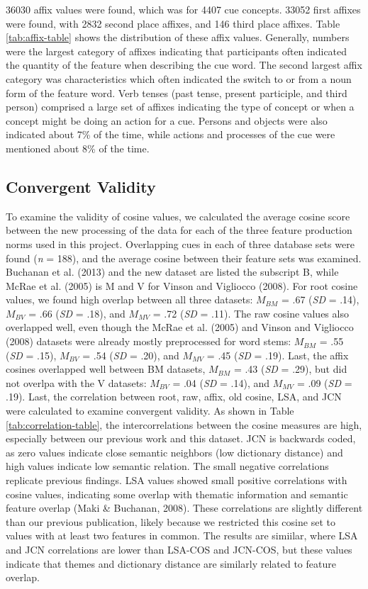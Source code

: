 \documentclass[english,man]{apa6}
\theoremstyle{definition}
\theoremstyle{definition}
\theoremstyle{definition}
\theoremstyle{remark}
\begin{document}
36030 affix values were found, which was for 4407 cue concepts. 33052
first affixes were found, with 2832 second place affixes, and 146 third
place affixes. Table \ref{tab:affix-table} shows the distribution of
these affix values. Generally, numbers were the largest category of
affixes indicating that participants often indicated the quantity of the
feature when describing the cue word. The second largest affix category
was characteristics which often indicated the switch to or from a noun
form of the feature word. Verb tenses (past tense, present participle,
and third person) comprised a large set of affixes indicating the type
of concept or when a concept might be doing an action for a cue. Persons
and objects were also indicated about 7\% of the time, while actions and
processes of the cue were mentioned about 8\% of the time.

\subsection{Convergent Validity}\label{convergent-validity}

To examine the validity of cosine values, we calculated the average
cosine score between the new processing of the data for each of the
three feature production norms used in this project. Overlapping cues in
each of three database sets were found (\emph{n} = 188), and the average
cosine between their feature sets was examined. Buchanan et al. (2013)
and the new dataset are listed the subscript B, while McRae et al.
(2005) is M and V for Vinson and Vigliocco (2008). For root cosine
values, we found high overlap between all three datasets: \(M_{BM}\) =
.67 (\emph{SD} = .14), \(M_{BV}\) = .66 (\emph{SD} = .18), and
\(M_{MV}\) = .72 (\emph{SD} = .11). The raw cosine values also
overlapped well, even though the McRae et al. (2005) and Vinson and
Vigliocco (2008) datasets were already mostly preprocessed for word
stems: \(M_{BM}\) = .55 (\emph{SD} = .15), \(M_{BV}\) = .54 (\emph{SD} =
.20), and \(M_{MV}\) = .45 (\emph{SD} = .19). Last, the affix cosines
overlapped well between BM datasets, \(M_{BM}\) = .43 (\emph{SD} = .29),
but did not overlpa with the V datasets: \(M_{BV}\) = .04 (\emph{SD} =
.14), and \(M_{MV}\) = .09 (\emph{SD} = .19). Last, the correlation
between root, raw, affix, old cosine, LSA, and JCN were calculated to
examine convergent validity. As shown in Table
\ref{tab:correlation-table}, the intercorrelations between the cosine
measures are high, especially between our previous work and this
dataset. JCN is backwards coded, as zero values indicate close semantic
neighbors (low dictionary distance) and high values indicate low
semantic relation. The small negative correlations replicate previous
findings. LSA values showed small positive correlations with cosine
values, indicating some overlap with thematic information and semantic
feature overlap (Maki \& Buchanan, 2008). These correlations are
slightly different than our previous publication, likely because we
restricted this cosine set to values with at least two features in
common. The results are simiilar, where LSA and JCN correlations are
lower than LSA-COS and JCN-COS, but these values indicate that themes
and dictionary distance are similarly related to feature overlap.
\end{document}
